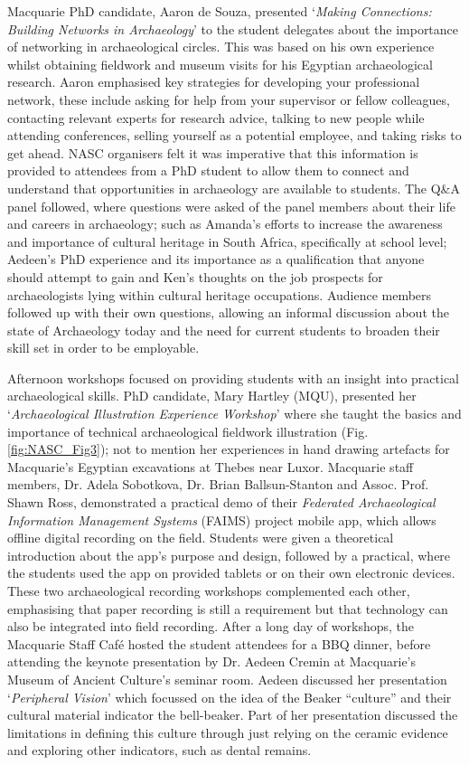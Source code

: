 Macquarie PhD candidate, Aaron de Souza, presented ‘\textit{Making Connections: Building Networks in Archaeology}’ to the student delegates about the importance of networking in archaeological circles. This was based on his own experience whilst obtaining fieldwork and museum visits for his Egyptian archaeological research. Aaron emphasised key strategies for developing your professional network, these include asking for help from your supervisor or fellow colleagues, contacting relevant experts for research advice, talking to new people while attending conferences, selling yourself as a potential employee, and taking risks to get ahead. NASC organisers felt it was imperative that this information is provided to attendees from a PhD student to allow them to connect and understand that opportunities in archaeology are available to students. The Q\&A panel followed, where questions were asked of the panel members about their life and careers in archaeology; such as Amanda’s efforts to increase the awareness and importance of cultural heritage in South Africa, specifically at school level; Aedeen’s PhD experience and its importance as a qualification that anyone should attempt to gain and Ken’s thoughts on the job prospects for archaeologists lying within cultural heritage occupations. Audience members followed up with their own questions, allowing an informal discussion about the state of Archaeology today and the need for current students to broaden their skill set in order to be employable.

Afternoon workshops focused on providing students with an insight into practical archaeological skills. PhD candidate, Mary Hartley (MQU), presented her ‘\textit{Archaeological Illustration Experience Workshop}’ where she taught the basics and importance of technical archaeological fieldwork illustration (Fig. \ref{fig:NASC_Fig3}); not to mention her experiences in hand drawing artefacts for Macquarie’s Egyptian excavations at Thebes near Luxor. Macquarie staff members, Dr. Adela Sobotkova, Dr. Brian Ballsun-Stanton and Assoc. Prof. Shawn Ross, demonstrated a practical demo of their \textit{Federated Archaeological Information Management Systems} (FAIMS) project mobile app, which allows offline digital recording on the field. Students were given a theoretical introduction about the app’s purpose and design, followed by a practical, where the students used the app on provided tablets or on their own electronic devices. These two archaeological recording workshops complemented each other, emphasising that paper recording is still a requirement but that technology can also be integrated into field recording. After a long day of workshops, the Macquarie Staff Café hosted the student attendees for a BBQ dinner, before attending the keynote presentation by Dr. Aedeen Cremin at Macquarie’s Museum of Ancient Culture’s seminar room. Aedeen discussed her presentation ‘\textit{Peripheral Vision}’ which focussed on the idea of the Beaker “culture” and their cultural material indicator the bell-beaker. Part of her presentation discussed the limitations in defining this culture through just relying on the ceramic evidence and exploring other indicators, such as dental remains.

